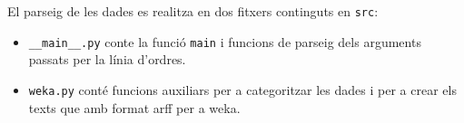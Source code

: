 
El parseig de les dades es realitza en dos fitxers continguts en \texttt{src}:
\begin{itemize}
	\item \verb|__main__.py| conte la funció \texttt{main} i funcions de parseig dels
	arguments passats per la línia d'ordres.
	\item \texttt{weka.py} conté funcions auxiliars per a categoritzar les dades i per a crear els
	texts que amb format arff per a weka.
\end{itemize}
